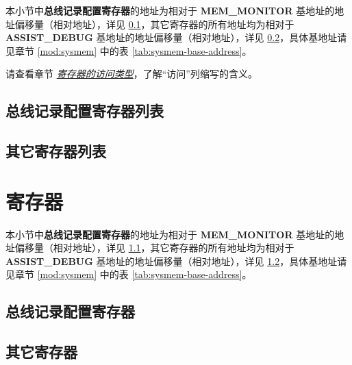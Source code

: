 \documentclass[main\_\_CN.tex]{subfiles}
\begin{document}
本小节中\textbf{总线记录配置寄存器}的地址为相对于 \textbf{MEM\_MONITOR} 基地址的地址偏移量（相对地址），详见 \ref{sec:dbgassist-mem-monitor-reg-summ}，其它寄存器的所有地址均为相对于 \textbf{ASSIST\_DEBUG} 基地址的地址偏移量（相对地址），详见 \ref{sec:dbgassist-bus-monitor-reg-summ}，具体基地址请见章节 \ref{mod:sysmem} \textit{} 中的表 \ref{tab:sysmem-base-address}。

请查看章节 \hyperref[glossary-access-types]{\textit{寄存器的访问类型}}，了解“访问”列缩写的含义。

\subsection{总线记录配置寄存器列表}
\label{sec:dbgassist-mem-monitor-reg-summ}



\subsection{其它寄存器列表}
\label{sec:dbgassist-bus-monitor-reg-summ}







\section{寄存器}

本小节中\textbf{总线记录配置寄存器}的地址为相对于 \textbf{MEM\_MONITOR} 基地址的地址偏移量（相对地址），详见 \ref{sec:dbgassist-mem-monitor-reg}，其它寄存器的所有地址均为相对于 \textbf{ASSIST\_DEBUG} 基地址的地址偏移量（相对地址），详见 \ref{sec:dbgassist-bus-monitor-reg}，具体基地址请见章节 \ref{mod:sysmem} \textit{} 中的表 \ref{tab:sysmem-base-address}。

\subsection{总线记录配置寄存器}
\label{sec:dbgassist-mem-monitor-reg}



\subsection{其它寄存器}
\label{sec:dbgassist-bus-monitor-reg}


\end{document}
